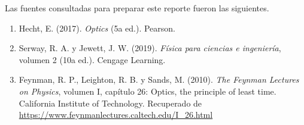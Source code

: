 Las fuentes consultadas para preparar este reporte fueron las siguientes.

\begin{enumerate}
\item Hecht, E. (2017). \textit{Optics} (5a ed.). Pearson.
\item Serway, R. A. y Jewett, J. W. (2019). \textit{Física para ciencias e ingeniería}, volumen 2 (10a ed.). Cengage Learning.
\item Feynman, R. P., Leighton, R. B. y Sands, M. (2010). \textit{The Feynman Lectures on Physics}, volumen I, capítulo 26: Optics, the principle of least time. California Institute of Technology. Recuperado de \url{https://www.feynmanlectures.caltech.edu/I_26.html}
\end{enumerate}
